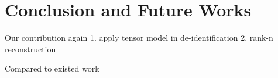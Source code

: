 \iffalse

\fi


\chapter{Conclusion and Future Works}

Our contribution again
1. apply tensor model in de-identification
2. rank-n reconstruction

Compared to existed work